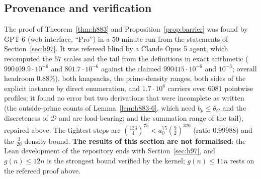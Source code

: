 \subsection*{Provenance and verification}
The proof of Theorem~\ref{thm:h883} and Proposition~\ref{prop:barrier} was found by GPT-6 (web interface, ``Pro'')
in a $50$-minute run from the statements of Section~\ref{sec:h97}. It was refereed blind by a Claude Opus 5 agent,
which recomputed the $57$ scales and the tail from the definitions in exact arithmetic
($990409.9\cdot10^{-6}$ and $801.7\cdot10^{-6}$ against the claimed $990415\cdot10^{-6}$ and $10^{-3}$; overall
headroom $0.88\%$), both knapsacks, the prime-density ranges, both sides of the explicit instance by direct
enumeration, and $1.7\cdot10^6$ carriers over $6081$ pointwise profiles; it found no error but two derivations that
were incomplete as written (the outside-prime counts of Lemma~\ref{lem:h883-6}, which need $b_p\le\theta_C$ and the
discreteness of $\mathcal D$ and are load-bearing; and the summation range of the tail), repaired above. The tightest
steps are $(\tfrac{133}4)^{75}<a_0^{75}(\tfrac92)^{326}$ (ratio $0.99988$) and the $\tfrac3{20}$ density bound.
\textbf{The results of this section are not formalised}: the Lean development of the repository ends with
Section~\ref{sec:h97}, and $g(n)\le12n$ is the strongest bound verified by the kernel; $g(n)\le11n$ rests on the
refereed proof above.
